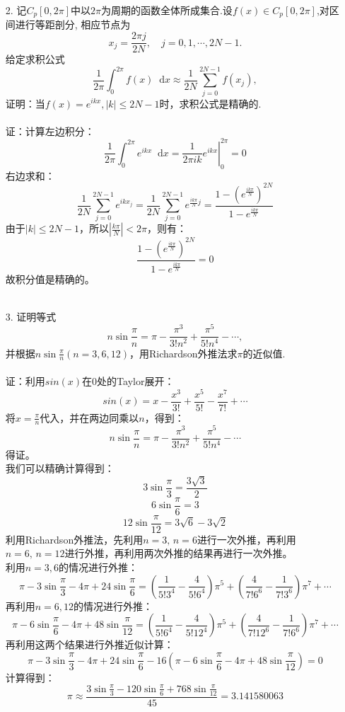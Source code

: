 \documentclass{article}
\newcommand*{\dif}{\mathop{}\!\mathrm{d}}
\begin{document}
\begin{itemize}
		\item[2.]记$C_p[0,2\pi]$中以$2\pi$为周期的函数全体所成集合.设$f(x)\in C_p[0, 2\pi]$,对区间进行等距剖分, 相应节点为
			$$x_j = \frac{2\pi j}{2N}, \quad j = 0,1,\cdots,2N - 1.$$
		给定求积公式
		$$\frac{1}{2\pi}\int_{0}^{2\pi}f(x)\dif x \approx \frac{1}{2N}\sum_{j =  0}^{2N - 1}f(x_j),$$
		证明：当$f(x) =e^{ikx},|k| \le 2N - 1$时，求积公式是精确的.\\\\
		证：计算左边积分：
		$$\frac{1}{2\pi}\int_{0}^{2\pi}e^{ikx}\dif x = \left.\frac{1}{2\pi ik}e^{ikx}\right|_{0}^{2\pi} = 0$$
		右边求和：
		$$ \frac{1}{2N}\sum_{j =  0}^{2N - 1}e^{ikx_j} = \frac{1}{2N}\sum_{j =  0}^{2N - 1}e^{\frac{ik\pi}{N}j} = \frac{ 1 - (e^{\frac{ik\pi}{N}})^{2N}}{1 - e^{\frac{ik\pi}{N}}}$$
		由于$|k| \le 2N - 1$，所以$|\frac{k\pi}{N}|< 2\pi$，则有：
		$$\frac{ 1 - (e^{\frac{ik\pi}{N}})^{2N}}{1 - e^{\frac{ik\pi}{N}}} = 0$$
		故积分值是精确的。\\\\
		\item[3.]证明等式
		$$n\sin \frac{\pi}{n} = \pi - \frac{\pi ^{3}}{3! n^2} + \frac{\pi ^5}{5!n^4} - \cdots,$$
		并根据$n\sin\frac{\pi}{n}(n = 3, 6, 12)$，用Richardson外推法求$\pi$的近似值.\\\\
		证：利用$sin(x)$在$0$处的Taylor展开：
		$$sin(x) = x - \frac{x^3}{3!} + \frac{x^5}{5!} - \frac{x^7}{7!}+\cdots$$
		将$x =  \frac{\pi}{n}$代入，并在两边同乘以$n$，得到：
		$$n\sin \frac{\pi}{n} = \pi - \frac{\pi ^{3}}{3! n^2} + \frac{\pi ^5}{5!n^4} - \cdots$$
		得证。\\
		我们可以精确计算得到：
		$$3\sin\frac{\pi}{3} = \frac{3\sqrt{3}}{2}$$
		$$6\sin\frac{\pi}{6} = 3$$
		$$12\sin \frac{\pi}{12} = 3\sqrt{6} - 3\sqrt{2}$$
		利用Richardson外推法，先利用$n = 3,\, n = 6$进行一次外推，再利用$n = 6,\, n = 12$进行外推，再利用两次外推的结果再进行一次外推。\\
		利用$n=3, 6$的情况进行外推：
		$$\pi - 3\sin\frac{\pi}{3} - 4\pi + 24\sin\frac{\pi}{6} =  (\frac{1}{5!3^4} - \frac{4}{5!6^4})\pi ^5 + (\frac{4}{7!6^6} - \frac{1}{7!3^6})\pi ^7+\cdots$$
		再利用$n = 6, 12$的情况进行外推：
		$$\pi - 6\sin\frac{\pi}{6} - 4\pi + 48\sin\frac{\pi}{12} = (\frac{1}{5!6^4} - \frac{4}{5!12^4})\pi ^5 + (\frac{4}{7!12^6} - \frac{1}{7!6^6})\pi ^7+\cdots$$
		再利用这两个结果进行外推近似计算：
		$$\pi - 3\sin\frac{\pi}{3} - 4\pi + 24\sin\frac{\pi}{6} - 16\left(\pi - 6\sin\frac{\pi}{6} - 4\pi + 48\sin\frac{\pi}{12}\right) = 0$$
		计算得到：
		$$\pi \approx \frac{3\sin\frac{\pi}{3}-120\sin\frac{\pi}{6}+768\sin\frac{\pi}{12}}{45}= 3.141580063$$\\

\end{itemize}
\end{document}
